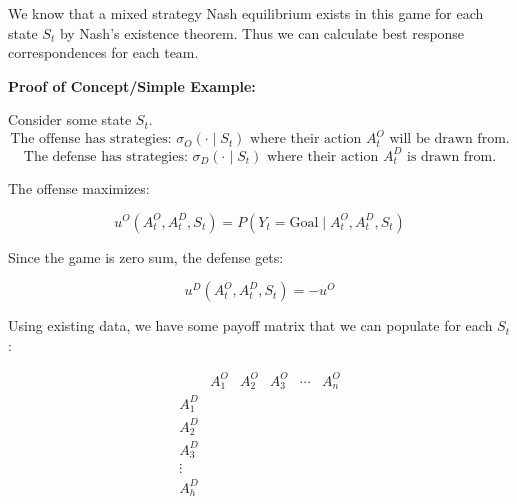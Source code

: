 \documentclass[11pt,english]{article}
\begin{document}
\begin{center}
\end{center} 
We know that a mixed strategy Nash equilibrium exists in this game for each state $S_t$ by Nash's existence theorem.  Thus we can calculate best response correspondences for each team. 


\noindent \textbf{Proof of Concept/Simple Example:}

Consider some state $S_t$.
\[
\text{The offense has strategies: }
\sigma_O(\cdot \mid S_t)
\text{ where their action } A_t^O
\text{ will be drawn from.}
\]
\[
\text{The defense has strategies: }
\sigma_D(\cdot \mid S_t)
\text{ where their action } A_t^D
\text{ is drawn from.}
\]

The offense maximizes:

\[
u^O(A_t^O, A_t^D, S_t)
=
P(Y_t = \text{Goal} \mid A_t^O, A_t^D, S_t)
\]

Since the game is zero sum, the defense gets:

\[
u^D(A_t^O, A_t^D, S_t)
=
- u^O
\]

Using existing data, we have some payoff matrix that we can populate for each $S_t$:

\[
\begin{array}{c|ccccc}
    & A_1^O & A_2^O & A_3^O & \cdots & A_n^O \\ \hline
A_1^D & & & & & \\
A_2^D & & & & & \\
A_3^D & & & & & \\
\vdots & & & & & \\
A_h^D & & & & &
\end{array}
\]
\end{document}
